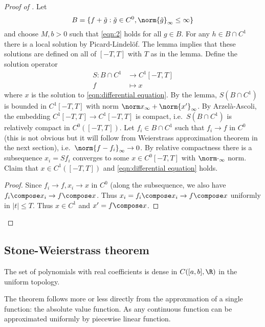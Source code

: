 \documentclass[a4paper]{article}
\begin{document}
\begin{proof}[Proof of ]
  Let
  \[
    B = \{f + \tilde g: \tilde g \in C^0, \norm{\tilde g}_\infty \leq \infty\}
  \]
  and choose \(M, b > 0\) such that \eqref{eqn:2} holds for all \(g \in B\). For any \(h \in B \cap C^1\) there is a local solution by Picard-Lindelöf. The lemma implies that these solutions are defined on all of \([-T, T]\) with \(T\) as in the lemma. Define the solution operator
  \begin{align*}
    S: B \cap C^1 &\to C^1[-T, T] \\
    f &\mapsto x
  \end{align*}
  where \(x\) is the solution to \eqref{eqn:differential equation}. By the lemma, \(S(B \cap C^1)\) is bounded in \(C^1[-T, T]\) with norm \(\norm x_\infty + \norm{x'}_\infty\). By Arzelà-Ascoli, the embedding \(C^1[-T, T] \to C^1[-T, T]\) is compact, i.e.\ \(S(B \cap C^1)\) is relatively compact in \(C^0([-T, T])\). Let \(f_i \in B \cap C^1\) such that \(f_i \to f\) in \(C^0\) (this is not obvious but it will follow from Weierstrass approximation theorem in the next section), i.e.\ \(\norm{f - f_i}_\infty \to 0\). By relative compactness there is a subsequence \(x_i = Sf_i\) converges to some \(x \in C^0[-T, T]\) with \(\norm \cdot_\infty\) norm. Claim that \(x \in C^1([-T, T])\) and \eqref{eqn:differential equation} holds.

  \begin{proof}
    Since \(f_i \to f,  x_i \to x\) in \(C^0\) (along the subsequence, we also have \(f_i \compose x_i \to f \compose x\). Thus \(x_i = f_i \compose x_i \to f \compose x\) uniformly in \(|t| \leq T\). Thus \(x \in C^1\) and \(x' = f \compose x\).
  \end{proof}
\end{proof}

\subsection{Stone-Weierstrass theorem}

\begin{theorem}
  \label{thm:Weierstrass approximation theorem}
  The set of polynomials with real coefficients is dense in \(C([a, b], \R)\) in the uniform topology.
\end{theorem}

The theorem follows more or less directly from the approxmation of a single function: the absolute value function. As any continuous function can be approximated uniformly by piecewise linear function.
\end{document}
